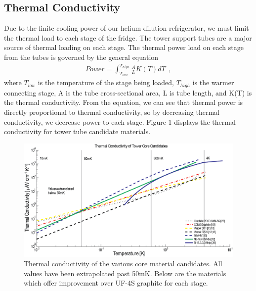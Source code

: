 \documentclass{report}
\begin{document}
\subsection{Thermal Conductivity}
Due to the finite cooling power of our helium dilution refrigerator, we must limit the
thermal load to each stage of the fridge. The tower support tubes are a major source of
thermal loading on each stage. The thermal power load on each stage from the tubes is
governed by the general equation
\begin{eqnarray}
Power = \int_{T_{low}}^{T_{high}} \frac{A}{L}K(T)dT \ \ , %
\end{eqnarray}
where $T_{low}$ is the temperature of the stage being loaded, $T_{high}$ is the warmer
connecting stage, A is the tube cross-sectional area, L is tube length, and K(T) is the
thermal conductivity. From the equation, we can see that thermal power is directly proportional
to thermal conductivity, so by decreasing thermal conductivity, we decrease power to each
stage. Figure 1 displays the thermal conductivity for tower tube candidate materials.
\begin{figure}[htb]
\includegraphics[width = \textwidth]{TowerCond.png}
\caption{Thermal conductivity of the various core material candidates. All values have been
extrapolated past 50mK. Below are the materials which offer improvement over UF-4S
graphite for each stage.}
\end{figure}
\end{document}
